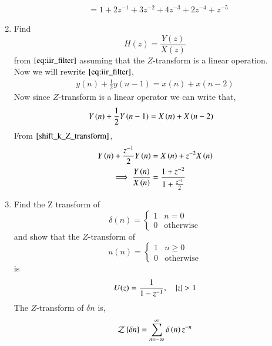 \documentclass[journal,12pt,twocolumn]{IEEEtran}
\renewcommand\thesection{\arabic{section}}
\begin{document}
\begin{enumerate}[label=\thesection.\arabic*]
\begin{align}
                                   &= 1 + 2z^{-1} + 3z^{-2} + 4z^{-3} + 2z^{-4} + z^{-5} 
    \end{align}
   \item Find
   \begin{equation}
   H(z) = \frac{Y(z)}{X(z)}
   \end{equation}
   from  $\eqref{eq:iir_filter}$ assuming that the $Z$-transform is a linear operation.
   \\
    \solution 
     Now we will rewrite $\eqref{eq:iir_filter}$,
      \begin{align}
          y(n) + \frac{1}{2}y(n-1) = x(n) + x(n-2)
      \end{align}
     Now since $Z$-transform is a linear operator we can write that,
      \begin{align}
          Y\left(n\right) + \frac{1}{2}Y\left(n-1\right) &= X\left(n\right) + X\left(n-2\right)
      \end{align}
      From $\eqref{shift_k_Z_transform}$,
      \begin{align}
          Y\left(n\right) + \frac{z^{-1}}{2}Y\left(n\right) &= X\left(n\right) + z^{-2}X\left(n\right)\\
       \implies \frac{Y\left(n\right)}{X\left(n\right)} &= \frac{1 + z^{-2}}{1 + \frac{z^{-1}}{2}} \label{eq:freq_resp}
      \end{align}       
      \item Find the Z transform of 
      \begin{equation}
      \label{delta}
      \delta(n)
      =
      \begin{cases}
      1 & n = 0
      \\
      0 & \text{otherwise}
      \end{cases}
      \end{equation}
      and show that the $Z$-transform of
      \begin{equation}
      \label{eq:unit_step}
      u(n)
      =
      \begin{cases}
      1 & n \ge 0
      \\
      0 & \text{otherwise}
      \end{cases}
      \end{equation}
      is
      \begin{equation}
      U(z) = \frac{1}{1-z^{-1}}, \quad \left\vert z\right\vert > 1
      \end{equation}
      \solution 
      The $Z$-transform of $\delta{n}$ is,
      \begin{align}
          \mathcal{Z}\cbrak{\delta{n}} &= \sum_{n=-\infty}^{\infty}\delta\brak{n}z^{-n}\\

\end{align}
\end{enumerate}
\end{document}
